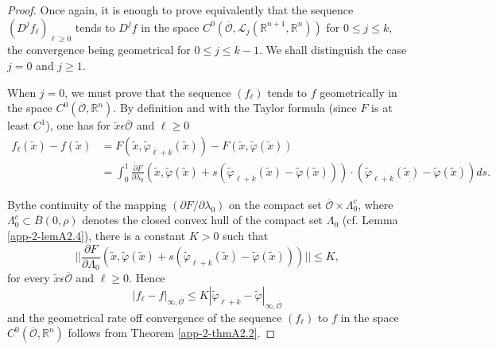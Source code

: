 \begin{proof}
Once again, it is enough to prove equivalently that the sequence
$(D^{j} f_{\ell})_{\ell \geq 0}$ tends to $D^{j}f$ in the space
$C^{0}(\overline{\mathscr{O}}, \mathscr{L}_{j}(\mathbb{R}^{n+1},
\mathbb{R}^{n}))$ for $0 \leq j \leq k$, the convergence being
geometrical for $0 \leq j \leq k-1$. We shall distinguish the case $j
= 0$ and $j \geq 1$.

When $j = 0$, we must prove that the sequence $(f_{\ell})$ tends to $f$
geometrically in the space $C^{0}(\overline{\mathscr{O}},
\mathbb{R}^{n})$. By definition and with the Taylor formula (since $F$
is at least $C^{1}$), one has for $\widetilde{x} \epsilon
\overline{\mathscr{O}}$ and $\ell \geq 0$
{\fontsize{10}{12}\selectfont
\begin{align*}
f_{\ell} (\widetilde{x}) - f(\widetilde{x}) & = F(\widetilde{x},
\widetilde{\varphi}_{\ell + k}(\widetilde{x})) - F(\widetilde{x},
\widetilde{\varphi}(\widetilde{x})) \\
& = \int_{0}^{1} \frac{\partial F}{\partial \lambda_{0}}
(\widetilde{x}, \widetilde{\varphi}(\widetilde{x}) +
s(\widetilde{\varphi}_{\ell + k} (\widetilde{x}) -
\widetilde{\varphi}(\widetilde{x}))) \cdot (\widetilde{\varphi}_{\ell
  + k}(\widetilde{x}) - \widetilde{\varphi}(\widetilde{x})) ds.
\end{align*}}

By\pageoriginale the continuity of the mapping $(\partial F / \partial
\lambda_{0})$ on the compact set $\overline{\mathscr{O}} \times
\Lambda_{0}^{c}$, where $\Lambda_{0}^{c} \subset \overline{B}(0,
\rho)$ denotes the closed convex hull of the compact set $\Lambda_{0}$
(cf. Lemma \ref{app-2-lemA2.4}), there is a constant $K > 0$ such that
$$
||\frac{\partial F}{\partial \Lambda_{0}} (\widetilde{x},
\widetilde{\varphi}(\widetilde{x}) + s(\widetilde{\varphi}_{\ell +
  k}(\widetilde{x}) - \widetilde{\varphi}(\widetilde{x})))|| \leq K,
$$
for every $\widetilde{x} \epsilon \overline{\mathscr{O}}$ and $\ell
\geq 0$. Hence
$$
|f_{\ell} - f|_{\infty, \overline{\mathscr{O}}} \leq
K|\widetilde{\varphi}_{\ell + k} - \widetilde{\varphi}|_{\infty,
  \overline{\mathscr{O}}} 
$$
and the geometrical rate off convergence of the sequence $(f_{\ell})$
to $f$ in the space $C^{0}(\overline{\mathscr{O}}, \mathbb{R}^{n})$
follows from Theorem \ref{app-2-thmA2.2}.


\end{proof}

